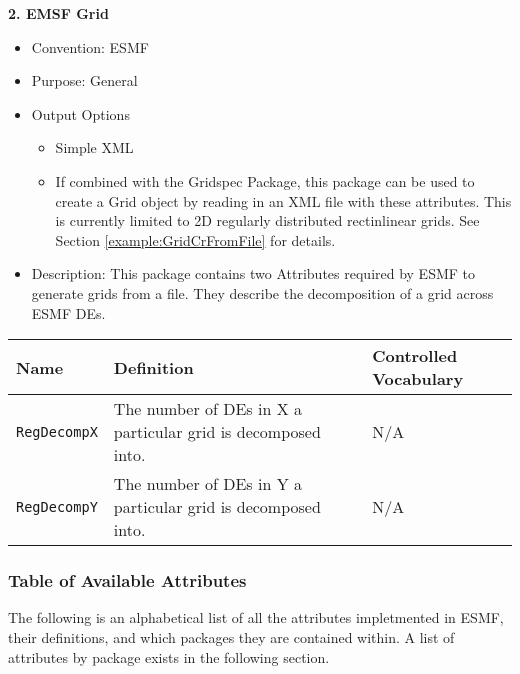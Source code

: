 \vspace{.20in}
{\bf 2. EMSF Grid}

\label{ESMFGridAttributePackage}

\begin{itemize}
    \item Convention: ESMF
    \item Purpose: General
    \item Output Options
    \begin{itemize}
        \item Simple XML
        \item If combined with the Gridspec Package, this package can be used to create a Grid object by reading in an XML file with these attributes. This is currently limited to 2D regularly distributed rectinlinear grids. See Section \ref{example:GridCrFromFile} for details. 
    \end{itemize}
    \item Description: This package contains two Attributes required by ESMF to generate grids from a file. They describe the decomposition of a grid across ESMF DEs.  
\end{itemize}


\begin{tabular}{|p{8cm}|p{20cm}|p{10cm}|}
{\bf Name} & {\bf Definition} & {\bf Controlled Vocabulary} \\
\hline\hline
{\tt RegDecompX} & The number of DEs in X a particular grid is decomposed into.& N/A\\
{\tt RegDecompY} & The number of DEs in Y a particular grid is decomposed into.& N/A\\
\end{tabular}



\vspace{.20in}
\subsubsection{Table of Available Attributes}

The following is an alphabetical list of all the attributes impletmented in ESMF, their definitions, and which packages they are contained within. A list of attributes by package exists in the following section. 


